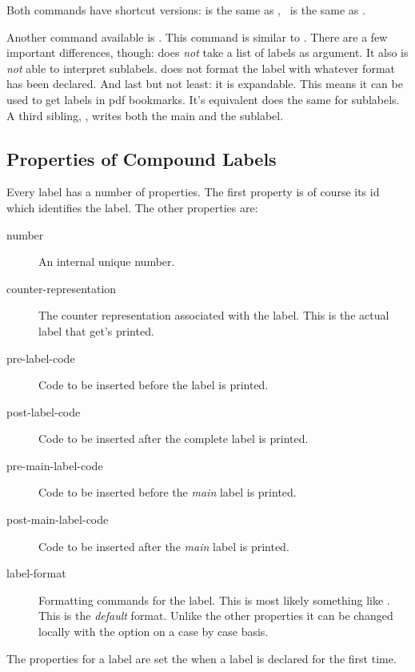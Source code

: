 \documentclass[load-preamble+,babel-options={ngerman,british,american}]{cnltx-doc}
\begin{document}
Both commands have shortcut versions: \code{+} is the same as
, \sarg\ is the same as .

Another command available is .  This command is
similar to .  There are a few important differences, though:
 does \emph{not} take a list of labels as argument.  It also is
\emph{not} able to interpret sublabels.   does not format the
label with whatever format has been declared.  And last but not least: it is
expandable.  This means it can be used to get labels in \ac{pdf} bookmarks.
It's equivalent  does
the same for sublabels.  A third sibling, , writes both the main and the sublabel.

\subsection{Properties of Compound Labels}\label{sec:prop-comp-labels}

Every label has a number of properties.  The first property is of course its
\acs{id} which identifies the label.  The other properties are:
\begin{description}
  \item[number] An internal unique number.
  \item[counter-representation] The counter representation associated with the
    label.  This is the actual label that get's printed.
  \item[pre-label-code] Code to be inserted before the label is printed.
  \item[post-label-code] Code to be inserted after the complete label is
    printed.
  \item[pre-main-label-code] Code to be inserted before the \emph{main} label
    is printed.
  \item[post-main-label-code] Code to be inserted after the \emph{main} label
    is printed.
  \item[label-format] Formatting commands for the label.  This is most likely
    something like .  This is the \emph{default} format.  Unlike
    the other properties it can be changed locally with the 
    option on a case by case basis.
\end{description}

The properties for a label are set the when a label is declared for the first
time.
\end{document}

